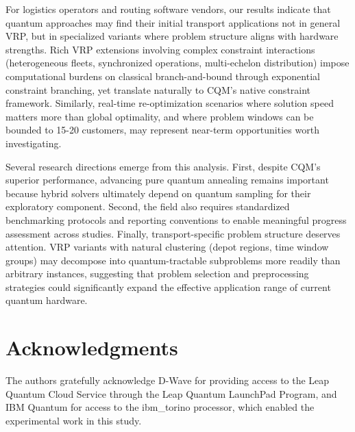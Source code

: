 \documentclass[preprint,3p,12pt,authoryear]{elsarticle}
\begin{document}
For logistics operators and routing software vendors, our results indicate that quantum approaches may find their initial transport applications not in general VRP, but in specialized variants where problem structure aligns with hardware strengths. Rich VRP extensions involving complex constraint interactions (heterogeneous fleets, synchronized operations, multi-echelon distribution) impose computational burdens on classical branch-and-bound through exponential constraint branching, yet translate naturally to CQM's native constraint framework. Similarly, real-time re-optimization scenarios where solution speed matters more than global optimality, and where problem windows can be bounded to 15-20 customers, may represent near-term opportunities worth investigating.

Several research directions emerge from this analysis. First, despite CQM's superior performance, advancing pure quantum annealing remains important because hybrid solvers ultimately depend on quantum sampling for their exploratory component. Second, the field also requires standardized benchmarking protocols and reporting conventions to enable meaningful progress assessment across studies. Finally, transport-specific problem structure deserves attention. VRP variants with natural clustering (depot regions, time window groups) may decompose into quantum-tractable subproblems more readily than arbitrary instances, suggesting that problem selection and preprocessing strategies could significantly expand the effective application range of current quantum hardware.

\section*{Acknowledgments}
The authors gratefully acknowledge D-Wave for providing access to the Leap Quantum Cloud Service through the Leap Quantum LaunchPad Program, and IBM Quantum for access to the ibm\_torino processor, which enabled the experimental work in this study.

 

\end{document}
